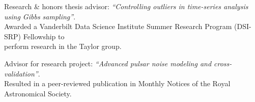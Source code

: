 \documentclass[11pt,letterpaper,sans]{moderncv}
\begin{document}
\vspace{-0.1cm}
\hspace{0.71cm} Research \& honors thesis advisor: \textit{``Controlling outliers in time-series analysis using Gibbs sampling''}. \\
\vspace{-0.1cm}
\hspace{0.65cm}Awarded a Vanderbilt Data Science Institute Summer Research Program (DSI-SRP) Fellowship to \\
\vspace{-0.1cm}
\hspace{0.71cm}perform research in the Taylor group.\vspace{0.1cm}


\vspace{-0.1cm}
\hspace{0.71cm} Advisor for research project: \textit{``Advanced pulsar noise modeling and cross-validation''}. \\
\vspace{-0.1cm}
\hspace{0.6cm} Resulted in a peer-reviewed publication in Monthly Notices of the Royal Astronomical Society. \vspace{0.1cm}

\end{document}
